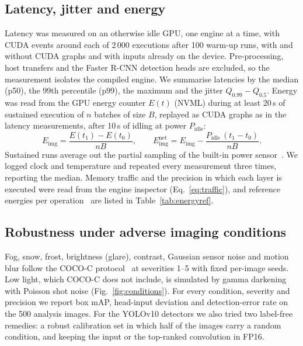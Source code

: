 \documentclass[pdflatex,sn-mathphys-num]{sn-jnl}%
\theoremstyle{thmstyleone}%
\theoremstyle{thmstyletwo}%
\theoremstyle{thmstylethree}%
\begin{document}
\subsection{Latency, jitter and energy}\label{sec:energy}

Latency was measured on an otherwise idle GPU, one engine at a time, with CUDA events around each of 2\,000 executions after 100 warm-up runs, with and without CUDA graphs and with inputs already on the device. Pre-processing, host transfers and the Faster R-CNN detection heads are excluded, so the measurement isolates the compiled engine. We summarise latencies by the median (p50), the 99th percentile (p99), the maximum and the jitter $Q_{0.99}-Q_{0.5}$. Energy was read from the GPU energy counter $E(t)$ (NVML) during at least 20\,s of sustained execution of $n$ batches of size $B$, replayed as CUDA graphs as in the latency measurements, after 10\,s of idling at power $P_\mathrm{idle}$:
\begin{equation}
E_\mathrm{img}=\frac{E(t_1)-E(t_0)}{nB},\qquad E_\mathrm{img}^\mathrm{net}=E_\mathrm{img}-\frac{P_\mathrm{idle}\,(t_1-t_0)}{nB}.\label{eq:energy}
\end{equation}
Sustained runs average out the partial sampling of the built-in power sensor~\cite{yang2024gpuenergy}. We logged clock and temperature and repeated every measurement three times, reporting the median. Memory traffic and the precision in which each layer is executed were read from the engine inspector (Eq.~\eqref{eq:traffic}), and reference energies per operation~\cite{horowitz2014energy} are listed in Table~\ref{tab:energyref}.

\subsection{Robustness under adverse imaging conditions}\label{sec:robustness}

Fog, snow, frost, brightness (glare), contrast, Gaussian sensor noise and motion blur follow the COCO-C protocol~\cite{michaelis2019benchmarking,hendrycks2019benchmarking} at severities 1--5 with fixed per-image seeds. Low light, which COCO-C does not include, is simulated by gamma darkening with Poisson shot noise (Fig.~\ref{fig:conditions}). For every condition, severity and precision we report box mAP, head-input deviation and detection-error rate on the 500 analysis images. For the YOLOv10 detectors we also tried two label-free remedies: a robust calibration set in which half of the images carry a random condition, and keeping the input or the top-ranked convolution in FP16.
\end{document}
